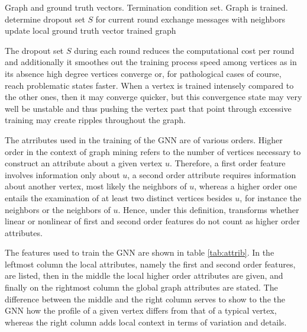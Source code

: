\documentclass[conference, compsoc, final]{IEEEtran}
\begin{document}
\begin{algorithm}[htbp]
\caption{GNN training}
\label{algo:gnn}
\begin{algorithmic}[1]
\REQUIRE  Graph and ground truth vectors.
\REQUIRE  Termination condition set.
\ENSURE  Graph is trained.
    \STATE  determine dropout set $S$ for current round
        \STATE  exchange messages with neighbors
	\STATE  update local ground truth vector
    \ENDFOR
\ENDWHILE
\RETURN trained graph
\end{algorithmic}
\end{algorithm}

The dropout set $S$ during each round reduces the computational cost per round and additionally it smoothes out the training process speed among vertices as in its absence high degree vertices converge or, for pathological cases of course, reach problematic states faster. When a vertex is trained intensely compared to the other ones, then it may converge quicker, but this convergence state may very well be unstable and thus pushing the vertex past that point through excessive training may create ripples throughout the graph.

The atrributes used in the training of the GNN are of various orders. Higher order in the context of graph mining refers to the number of vertices necessary to construct an attribute about a given vertex $u$. Therefore, a first order feature involves information only about $u$, a second order attribute requires information about another vertex, most likely the neighbors of $u$, whereas a higher order one entails the examination of at least two distinct vertices besides $u$, for instance the neighbors or the neighbors of $u$. Hence, under this definition, transforms whether linear or nonlinear of first and second order features do not count as higher order attributes.

The features used to train the GNN are shown in table \ref{tab:attrib}. In the leftmost column the local attributes, namely the first and second order features, are listed, then in the middle the local higher order attributes are given, and finally on the rightmost column the global graph attributes are stated. The difference between the middle and the right column serves to show to the the GNN how the profile of a given vertex differs from that of a typical vertex, whereas the right column adds local context in terms of variation and details.
\end{document}
